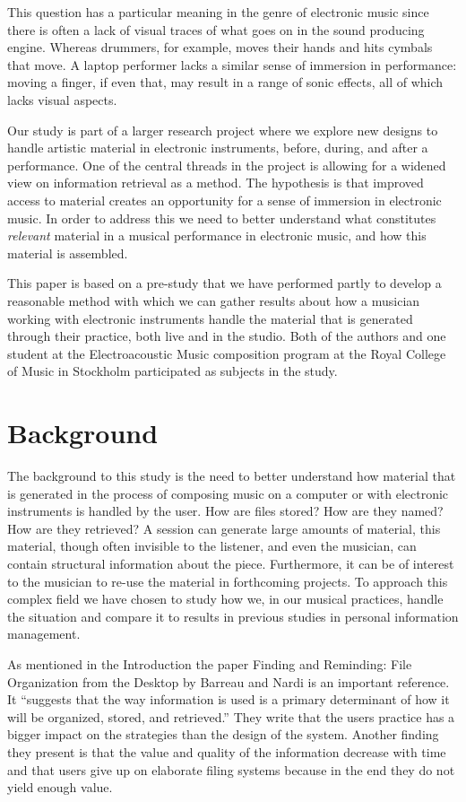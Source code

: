 \documentclass[runningheads,a4paper]{cmmr2023}
\begin{document}
This question has a particular meaning in the genre of electronic music since there is often a lack of visual traces of what goes on in the sound producing engine. Whereas drummers, for example, moves their hands and hits cymbals that move. A laptop performer lacks a similar sense of immersion in performance: moving a finger, if even that, may result in a range of sonic effects, all of which lacks visual aspects.

Our study is part of a larger research project where we explore new designs to handle artistic material in electronic instruments, before, during, and after a performance. One of the central threads in the project is allowing for a widened view on information retrieval as a method. The hypothesis is that improved access to material creates an opportunity for a sense of immersion in electronic music. In order to address this we need to better understand what constitutes \emph{relevant} material in a musical performance in electronic music, and how this material is assembled.

This paper is based on a pre-study that we have performed partly to develop a reasonable method with which we can gather results about how a musician working with electronic instruments handle the material that is generated through their practice, both live and in the studio.
Both of the authors and one student at the Electroacoustic Music composition program at the Royal College of Music in Stockholm participated as subjects in the study. 

\section{Background}
The background to this study is the need to better understand how material that is generated in the process of composing music on a computer or with electronic instruments is handled by the user. How are files stored? How are they named? How are they retrieved? A  session can generate large amounts of material, this material, though often invisible to the listener, and even the musician, can contain structural information about the piece. Furthermore, it can be of interest to the musician to re-use the material in forthcoming projects. To approach this complex field we have chosen to study how we, in our musical practices, handle the situation and compare it to results in previous studies in personal information management.

As mentioned in the Introduction the paper Finding and Reminding: File Organization from the Desktop by Barreau and Nardi\cite{Barreau1995} is an important reference. It “suggests that the way information is used is a primary determinant of how it will be organized, stored, and retrieved.” They write that the users practice has a bigger impact on the strategies than the design of the system. Another finding they present is that the value and quality of the information decrease with time and that users give up on elaborate filing systems because in the end they do not yield enough value. 
\end{document}

